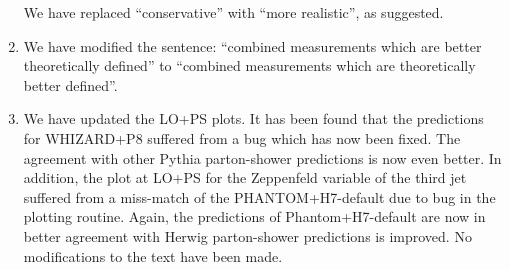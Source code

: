 \documentclass{report}
\begin{document}
\begin{enumerate}
We have replaced ``conservative'' with ``more realistic'', as suggested.

\item We have modified the sentence:
``combined measurements which are better theoretically defined'' to ``combined measurements which are theoretically better defined''.

\item We have updated the LO+PS plots.
It has been found that the predictions for WHIZARD+P8 suffered from a bug which has now been fixed.
The agreement with other Pythia parton-shower predictions is now even better.
In addition, the plot at LO+PS for the Zeppenfeld variable of the third jet suffered from a miss-match of the PHANTOM+H7-default due to bug in the plotting routine.
Again, the predictions of Phantom+H7-default are now in better agreement with Herwig parton-shower predictions is improved.
No modifications to the text have been made.

\end{enumerate}
\end{document}
